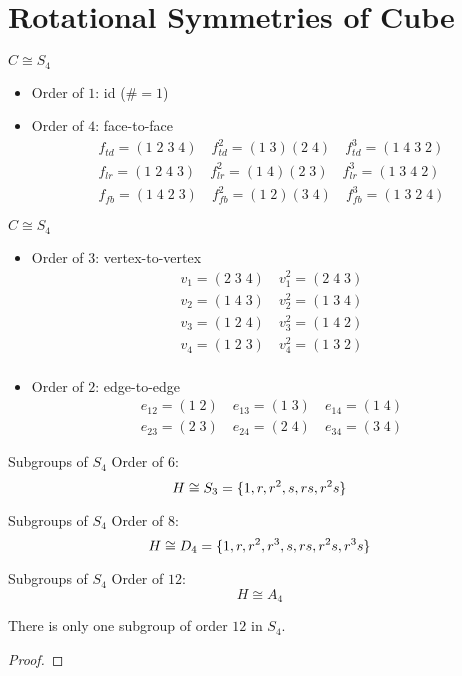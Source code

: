\section{Rotational Symmetries of Cube}

\begin{frame}{$C \cong S_4$}
  \begin{itemize}
    \item Order of $1$: id ($\# = 1$)
    \item Order of $4$: face-to-face
      \begin{align*}
	 f_{td} = (1\;2\;3\;4) \quad f_{td}^{2} = (1\;3) (2\;4)  \quad f_{td}^{3} = (1\;4\;3\;2) \\
	 f_{lr} = (1\;2\;4\;3) \quad f_{lr}^{2} = (1\;4) (2\;3)  \quad f_{lr}^{3} = (1\;3\;4\;2) \\
	 f_{fb} = (1\;4\;2\;3) \quad f_{fb}^{2} = (1\;2) (3\;4)  \quad f_{fb}^{3} = (1\;3\;2\;4)
      \end{align*}
  \end{itemize}
\end{frame}
\begin{frame}{$C \cong S_4$}
  \begin{itemize}
    \item Order of $3$: vertex-to-vertex
      \begin{align*}
        v_{1} = (2\;3\;4) \quad v_{1}^{2} = (2\;4\;3) \\
        v_{2} = (1\;4\;3) \quad v_{2}^{2} = (1\;3\;4) \\
        v_{3} = (1\;2\;4) \quad v_{3}^{2} = (1\;4\;2) \\
        v_{4} = (1\;2\;3) \quad v_{4}^{2} = (1\;3\;2) \\
      \end{align*}
    \item Order of $2$: edge-to-edge
      \begin{align*}
        e_{12} = (1\;2) \quad e_{13} = (1\;3) \quad e_{14} = (1\;4) \\
        e_{23} = (2\;3) \quad e_{24} = (2\;4) \quad e_{34} = (3\;4)
      \end{align*}
  \end{itemize}
\end{frame}
\begin{frame}{Subgroups of $S_4$}
  Order of $6$:
  \[
    H \cong S_3 = \{1, r, r^2, s, rs, r^2s\}
  \]
\end{frame}
\begin{frame}{Subgroups of $S_4$}
  Order of $8$:
  \[
    H \cong D_4 = \{1, r, r^2, r^3, s, rs, r^2s, r^3s\}
  \]
\end{frame}
\begin{frame}{Subgroups of $S_4$}
  Order of $12$:
  \[
    H \cong A_4
  \]

  \begin{theorem}
    There is only one subgroup of order $12$ in $S_4$.
  \end{theorem}
  \begin{proof}
  \end{proof}
\end{frame}
